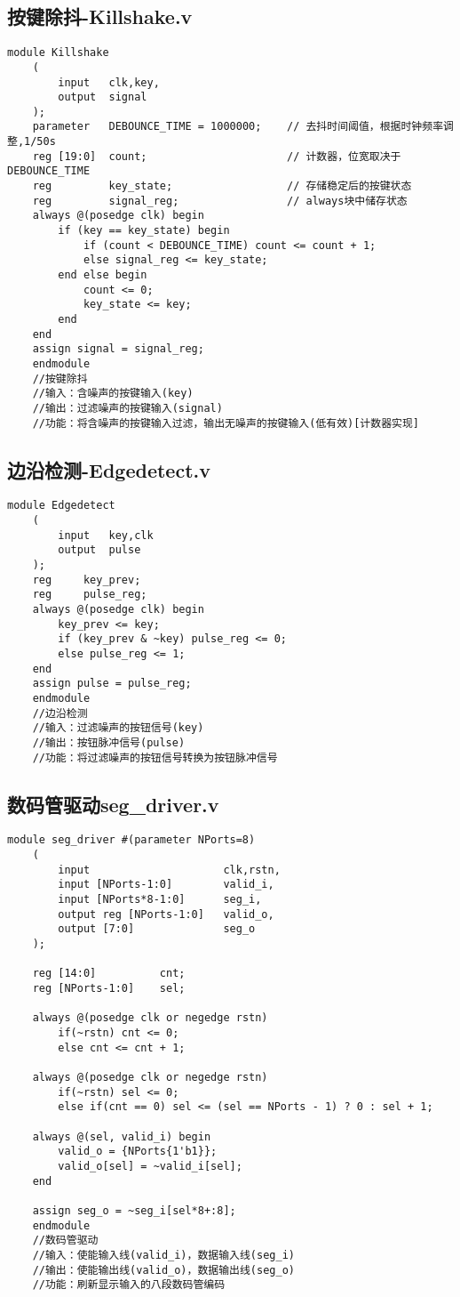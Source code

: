 	\subsection{按键除抖-Killshake.v}
	\begin{lstlisting}[style=verilog]
	module Killshake
	(
		input   clk,key,
		output  signal
	);
	parameter   DEBOUNCE_TIME = 1000000;    // 去抖时间阈值，根据时钟频率调整,1/50s
	reg [19:0]  count;                      // 计数器，位宽取决于DEBOUNCE_TIME
	reg         key_state;                  // 存储稳定后的按键状态
	reg         signal_reg;                 // always块中储存状态
	always @(posedge clk) begin
		if (key == key_state) begin
			if (count < DEBOUNCE_TIME) count <= count + 1;
			else signal_reg <= key_state;
		end else begin
			count <= 0;
			key_state <= key;
		end
	end
	assign signal = signal_reg;
	endmodule
	//按键除抖
	//输入：含噪声的按键输入(key)
	//输出：过滤噪声的按键输入(signal)
	//功能：将含噪声的按键输入过滤，输出无噪声的按键输入(低有效)[计数器实现]
	\end{lstlisting}
	\subsection{边沿检测-Edgedetect.v}
	\begin{lstlisting}[style=verilog]
	module Edgedetect
	(
		input   key,clk   
		output  pulse
	);
	reg     key_prev;  				
	reg     pulse_reg;  
	always @(posedge clk) begin
		key_prev <= key;
		if (key_prev & ~key) pulse_reg <= 0;
		else pulse_reg <= 1;
	end
	assign pulse = pulse_reg;
	endmodule
	//边沿检测
	//输入：过滤噪声的按钮信号(key)
	//输出：按钮脉冲信号(pulse)
	//功能：将过滤噪声的按钮信号转换为按钮脉冲信号
	\end{lstlisting}
	\newpage
	\subsection{数码管驱动seg\_driver.v}
	\begin{lstlisting}[style=verilog]
	module seg_driver #(parameter NPorts=8)
	(
		input                     clk,rstn, 
		input [NPorts-1:0]        valid_i, 
		input [NPorts*8-1:0]      seg_i, 
		output reg [NPorts-1:0]   valid_o, 
		output [7:0]              seg_o 
	);
	
	reg [14:0]          cnt;        
	reg [NPorts-1:0]    sel;       
	
	always @(posedge clk or negedge rstn) 
		if(~rstn) cnt <= 0;
		else cnt <= cnt + 1;
	
	always @(posedge clk or negedge rstn) 
		if(~rstn) sel <= 0;
		else if(cnt == 0) sel <= (sel == NPorts - 1) ? 0 : sel + 1;
	
	always @(sel, valid_i) begin
		valid_o = {NPorts{1'b1}}; 
		valid_o[sel] = ~valid_i[sel]; 
	end
	
	assign seg_o = ~seg_i[sel*8+:8]; 
	endmodule
	//数码管驱动
	//输入：使能输入线(valid_i)，数据输入线(seg_i)
	//输出：使能输出线(valid_o)，数据输出线(seg_o)
	//功能：刷新显示输入的八段数码管编码
	\end{lstlisting}
	\newpage
